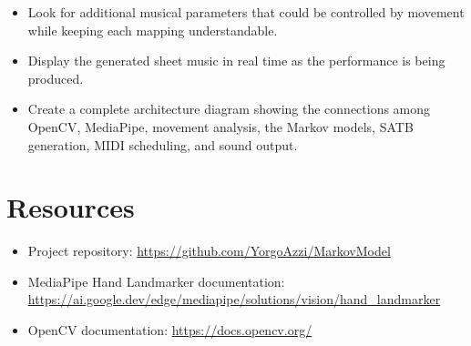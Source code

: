 \documentclass[11pt,a4paper]{article}
\begin{document}
\begin{itemize}
    \item Look for additional musical parameters that could be controlled by
    movement while keeping each mapping understandable.
    \item Display the generated sheet music in real time as the performance is
    being produced.
    \item Create a complete architecture diagram showing the connections among
    OpenCV, MediaPipe, movement analysis, the Markov models, SATB generation,
    MIDI scheduling, and sound output.
\end{itemize}

\section{Resources}

\begin{itemize}
    \item Project repository:
    \url{https://github.com/YorgoAzzi/MarkovModel}
    \item MediaPipe Hand Landmarker documentation:
    \url{https://ai.google.dev/edge/mediapipe/solutions/vision/hand_landmarker}
    \item OpenCV documentation:
    \url{https://docs.opencv.org/}
\end{itemize}
\end{document}
